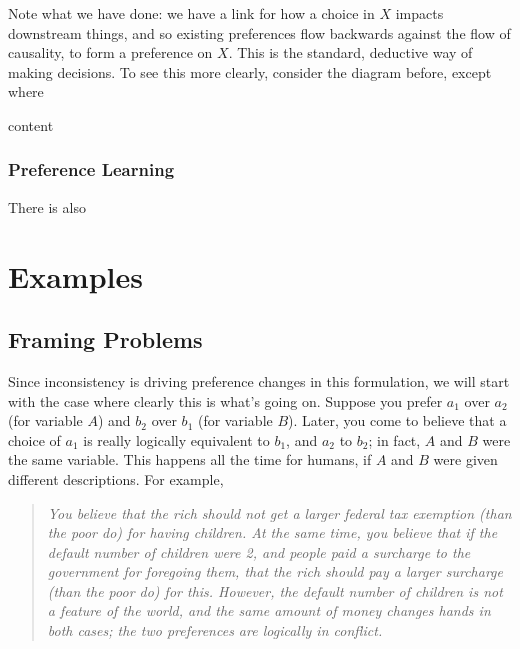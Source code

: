 \documentclass{article}
\begin{document}
	Note what we have done: we have a link for how a choice in $X$ impacts downstream things, and so existing preferences flow backwards against the flow of causality, to form a preference on $X$. This is the standard, deductive way of making decisions. To see this more clearly, consider the diagram before, except where 
	
	\begin{center}
		\begin{}
			content
		\end{}
	\end{center}
	
	
	\subsubsection{Preference Learning}
	
	There is also 
	
	
	
	
		
	
	
	\section{Examples}
	
	
	\subsection{Framing Problems}
	Since inconsistency is driving preference changes in this formulation, we will start with the case where clearly this is what's going on. 
	Suppose you prefer $a_1$ over $a_2$ (for variable $A$) and $b_2$ over $b_1$ (for variable $B$). Later, you come to believe that a choice of $a_1$ is really logically equivalent to $b_1$, and $a_2$ to $b_2$; in fact, $A$ and $B$ were the same variable. This happens all the time for humans, if $A$ and $B$ were given different descriptions. For example,
	
	\begin{quotation}
		\it\small
		You believe that the rich should not get a larger federal tax exemption (than the poor do) for having children.
		At the same time, you believe that if the default number of children were 2, and people paid a surcharge to the government for foregoing them, that the rich should pay a larger surcharge (than the poor do) for this. 
		However, the default number of children is not a feature of the world, and the same amount of money changes hands in both cases; the two preferences are logically in conflict.
		
	\end{quotation}
	
\end{document}
